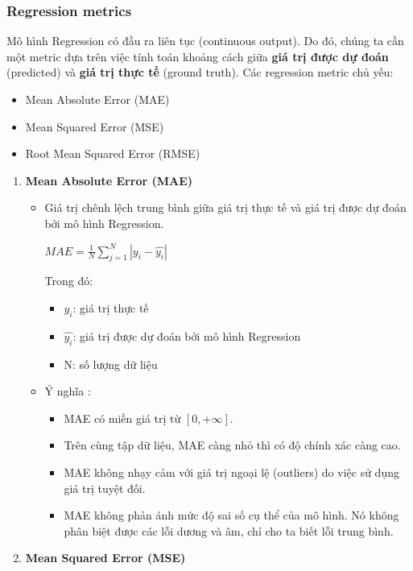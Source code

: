 \subsubsection{Regression metrics}
Mô hình Regression có đầu ra liên tục (continuous output). Do đó, chúng ta cần một metric dựa trên việc tính toán khoảng cách giữa \textbf{giá trị được dự đoán} (predicted) và \textbf{giá trị thực tế} (ground truth). Các regression metric chủ yếu: \cite{lecture_og}
\begin{itemize}
    \item Mean Absolute Error (MAE)
    \item Mean Squared Error (MSE)
    \item Root Mean Squared Error (RMSE)
\end{itemize}

\begin{enumerate}

\item \textbf{Mean Absolute Error (MAE)} 
\begin{itemize}
\item Giá trị chênh lệch trung bình giữa giá trị thực tế và giá trị được dự đoán bởi mô hình Regression.

\begin{center}
\large $MAE = \frac{1}{N}\sum_{j=1}^{N}\left| y_{i}-\hat{y_{i}} \right|$
\end{center}
Trong đó:
\begin{itemize}
    \item $y_{i}$: giá trị thực tế
    \item $\hat{y_{i}}$: giá trị được dự đoán bởi mô hình Regression
    \item N: số lượng dữ liệu
\end{itemize}
\item Ý nghĩa :
\begin{itemize}
\item MAE có miền giá trị từ $[0,+\infty ]$. 
\item Trên cùng tập dữ liệu, MAE càng nhỏ thì có độ chính xác càng cao.
\item MAE không nhạy cảm với giá trị ngoại lệ (outliers) do việc sử dụng giá trị tuyệt đối.
\item MAE không phản ánh mức độ sai số cụ thể của mô hình. Nó không phân biệt được các lỗi dương và âm, chỉ cho ta biết lỗi trung bình.
\end{itemize}
\end{itemize}
\item\textbf{Mean Squared Error (MSE)}
\begin{itemize}


\end{itemize}
\end{enumerate}
